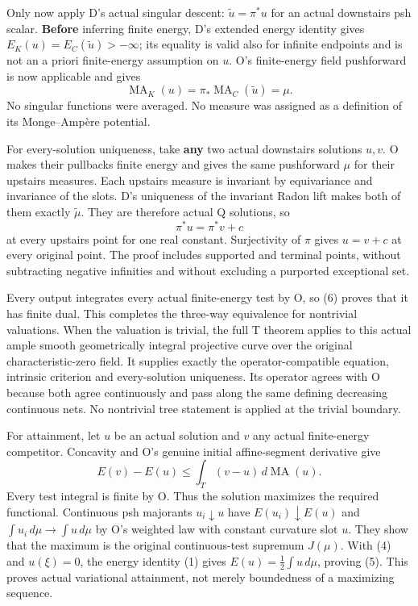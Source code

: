 \documentclass[
  11pt,
]{article}
\begin{document}
Only now apply D's actual singular descent: \(\widetilde u=\pi^*u\) for
an actual downstairs psh scalar. \textbf{Before} inferring finite
energy, D's extended energy identity gives
\(E_K(u)=E_C(\widetilde u)>-\infty\); its equality is valid also for
infinite endpoints and is not an a priori finite-energy assumption on
\(u\). O's finite-energy field pushforward is now applicable and gives
\[
\operatorname{MA}_K(u)=\pi_*\operatorname{MA}_C(\widetilde u)=\mu.
\tag{11}
\] No singular functions were averaged. No measure was assigned as a
definition of its Monge--Ampère potential.

For every-solution uniqueness, take \textbf{any} two actual downstairs
solutions \(u,v\). O makes their pullbacks finite energy and gives the
same pushforward \(\mu\) for their upstairs measures. Each upstairs
measure is invariant by equivariance and invariance of the slots. D's
uniqueness of the invariant Radon lift makes both of them exactly
\(\widetilde\mu\). They are therefore actual Q solutions, so \[
\pi^*u=\pi^*v+c
\] at every upstairs point for one real constant. Surjectivity of
\(\pi\) gives \(u=v+c\) at every original point. The proof includes
supported and terminal points, without subtracting negative infinities
and without excluding a purported exceptional set.

Every output integrates every actual finite-energy test by O, so (6)
proves that it has finite dual. This completes the three-way equivalence
for nontrivial valuations. When the valuation is trivial, the full T
theorem applies to this actual ample smooth geometrically integral
projective curve over the original characteristic-zero field. It
supplies exactly the operator-compatible equation, intrinsic criterion
and every-solution uniqueness. Its operator agrees with O because both
agree continuously and pass along the same defining decreasing
continuous nets. No nontrivial tree statement is applied at the trivial
boundary.

For attainment, let \(u\) be an actual solution and \(v\) any actual
finite-energy competitor. Concavity and O's genuine initial
affine-segment derivative give \[
E(v)-E(u)\leq\int_T(v-u)\,d\operatorname{MA}(u).
\tag{12}
\] Every test integral is finite by O. Thus the solution maximizes the
required functional. Continuous psh majorants \(u_i\downarrow u\) have
\(E(u_i)\downarrow E(u)\) and \(\int u_i\,d\mu\to\int u\,d\mu\) by O's
weighted law with constant curvature slot \(u\). They show that the
maximum is the original continuous-test supremum \(J(\mu)\). With (4)
and \(u(\xi)=0\), the energy identity (1) gives
\(E(u)=\tfrac12\int u\,d\mu\), proving (5). This proves actual
variational attainment, not merely boundedness of a maximizing sequence.
\end{document}
